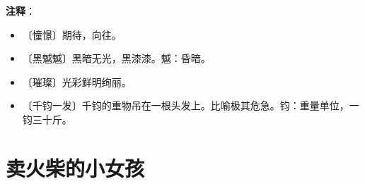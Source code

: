 \documentclass[12pt,UTF-8,openany]{ctexbook}
\begin{document}
\newpage

\textbf{注释}：

\vspace{-1em}

\begin{itemize}
    \setlength\itemsep{-0.2em}
    \item 〔憧憬〕期待，向往。
    \item 〔黑魆魆〕黑暗无光，黑漆漆。魆：昏暗。
    \item 〔璀璨〕光彩鲜明绚丽。
    \item 〔千钧一发〕千钧的重物吊在一根头发上。比喻极其危急。钧：重量单位，一钧三十斤。
\end{itemize}

\chapter{卖火柴的小女孩}
\end{document}
